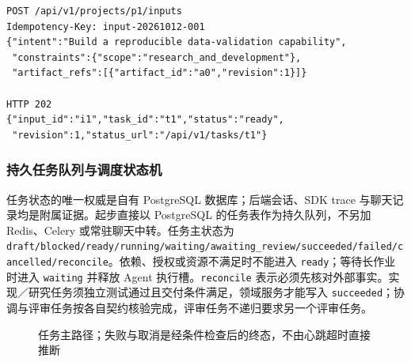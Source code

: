 \documentclass[11pt,a4paper]{article}
\begin{document}
\par\noindent\begin{minipage}{\linewidth}
\begin{lstlisting}[caption={意图接收与响应示例；标识均为缩写}]
POST /api/v1/projects/p1/inputs
Idempotency-Key: input-20261012-001
{"intent":"Build a reproducible data-validation capability",
 "constraints":{"scope":"research_and_development"},
 "artifact_refs":[{"artifact_id":"a0","revision":1}]}

HTTP 202
{"input_id":"i1","task_id":"t1","status":"ready",
 "revision":1,"status_url":"/api/v1/tasks/t1"}
\end{lstlisting}
\end{minipage}\par

\subsubsection{持久任务队列与调度状态机}

任务状态的唯一权威是自有 PostgreSQL 数据库；后端会话、SDK trace 与聊天记录均是附属证据。起步直接以 PostgreSQL 的任务表作为持久队列，不另加 Redis、Celery 或常驻聊天中转。任务主状态为 \texttt{draft/blocked/ready/running/waiting/awaiting\_review/succeeded/failed/cancelled/reconcile}。依赖、授权或资源不满足时不能进入 \texttt{ready}；等待长作业时进入 \texttt{waiting} 并释放 Agent 执行槽。\texttt{reconcile} 表示必须先核对外部事实。实现／研究任务须独立测试通过且交付条件满足，领域服务才能写入 \texttt{succeeded}；协调与评审任务按各自契约核验完成，评审任务不递归要求另一个评审任务。

\begin{figure}[htbp]
\centering
{}
\caption{任务主路径；失败与取消是经条件检查后的终态，不由心跳超时直接推断}
\end{figure}
\end{document}

